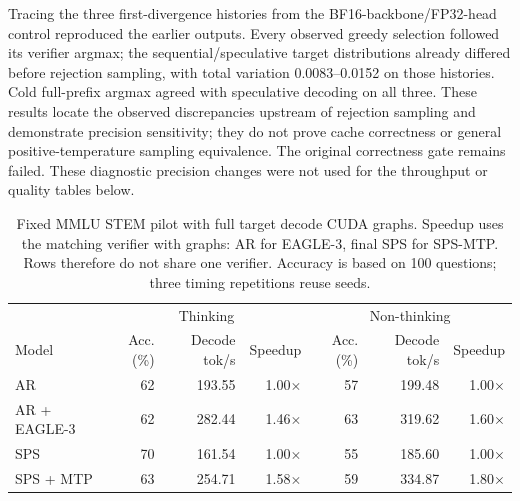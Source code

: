 Tracing the three first-divergence histories from the BF16-backbone/FP32-head control reproduced the earlier outputs. Every observed greedy selection followed its verifier argmax; the sequential/speculative target distributions already differed before rejection sampling, with total variation 0.0083--0.0152 on those histories. Cold full-prefix argmax agreed with speculative decoding on all three. These results locate the observed discrepancies upstream of rejection sampling and demonstrate precision sensitivity; they do not prove cache correctness or general positive-temperature sampling equivalence. The original correctness gate remains failed. These diagnostic precision changes were not used for the throughput or quality tables below.

\begin{table}[t]
\centering\small
\begin{tabular}{lrrrrrr}
\toprule
& \multicolumn{3}{c}{Thinking} & \multicolumn{3}{c}{Non-thinking}\\
Model & Acc. (\%) & Decode tok/s & Speedup & Acc. (\%) & Decode tok/s & Speedup\\
\midrule
AR & 62 & 193.55 & 1.00$\times$ & 57 & 199.48 & 1.00$\times$\\
AR + EAGLE-3 & 62 & 282.44 & 1.46$\times$ & 63 & 319.62 & 1.60$\times$\\
SPS & 70 & 161.54 & 1.00$\times$ & 55 & 185.60 & 1.00$\times$\\
SPS + MTP & 63 & 254.71 & 1.58$\times$ & 59 & 334.87 & 1.80$\times$\\
\bottomrule
\end{tabular}
\caption{Fixed MMLU STEM pilot with full target decode CUDA graphs. Speedup uses the matching verifier with graphs: AR for EAGLE-3, final SPS for SPS-MTP. Rows therefore do not share one verifier. Accuracy is based on 100 questions; three timing repetitions reuse seeds.}
\label{tab:serving-graphs}
\end{table}

